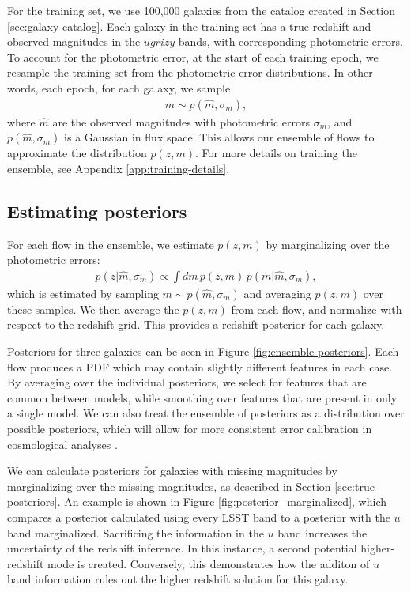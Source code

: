\documentclass[twocolumn,twocolappendix,linenumbers]{aastex631}
\begin{document}
For the training set, we use 100,000 galaxies from the catalog created in Section \ref{sec:galaxy-catalog}.
Each galaxy in the training set has a true redshift and observed magnitudes in the $ugrizy$ bands, with corresponding photometric errors.
To account for the photometric error, at the start of each training epoch, we resample the training set from the photometric error distributions.
In other words, each epoch, for each galaxy, we sample
\begin{align}
    m \sim p(\hat{m}, \sigma_m),
\end{align}
where $\hat{m}$ are the observed magnitudes with photometric errors $\sigma_m$, and $p(\hat{m}, \sigma_m)$ is a Gaussian in flux space.
This allows our ensemble of flows to approximate the distribution $p(z, m)$.
For more details on training the ensemble, see Appendix \ref{app:training-details}.


\subsection{Estimating posteriors}

For each flow in the ensemble, we estimate $p(z, m)$ by marginalizing over the photometric errors:
\begin{align}
    p(z| \hat{m}, \sigma_m) \propto \int dm \, p(z, m) \, p(m| \hat{m}, \sigma_m),
\end{align}
which is estimated by sampling $m \sim p(\hat{m}, \sigma_m)$ and averaging $p(z, m)$ over these samples.
We then average the $p(z, m)$ from each flow, and normalize with respect to the redshift grid.
This provides a redshift posterior for each galaxy.

Posteriors for three galaxies can be seen in Figure \ref{fig:ensemble-posteriors}.
Each flow produces a PDF which may contain slightly different features in each case.
By averaging over the individual posteriors, we select for features that are common between models, while smoothing over features that are present in only a single model.
We can also treat the ensemble of posteriors as a distribution over possible posteriors, which will allow for more consistent error calibration in cosmological analyses \citep{zhang2023}.

We can calculate posteriors for galaxies with missing magnitudes by marginalizing over the missing magnitudes, as described in Section \ref{sec:true-posteriors}.
An example is shown in Figure \ref{fig:posterior_marginalized}, which compares a posterior calculated using every LSST band to a posterior with the $u$ band marginalized.
Sacrificing the information in the $u$ band increases the uncertainty of the redshift inference.
In this instance, a second potential higher-redshift mode is created.
Conversely, this demonstrates how the additon of $u$ band information rules out the higher redshift solution for this galaxy.
\end{document}
